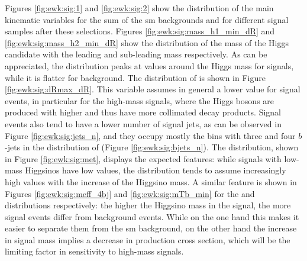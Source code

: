 Figures \ref{fig:ewk:sig:1} and \ref{fig:ewk:sig:2}  show the distribution of the main kinematic variables for 
the sum of the \gls{sm} backgrounds and for different signal samples after these selections.
Figures \ref{fig:ewk:sig:mass_h1_min_dR} and \ref{fig:ewk:sig:mass_h2_min_dR} show the distribution of the mass of the Higgs 
candidate with the leading and sub-leading mass respectively. As can be appreciated, the distribution peaks at values around the Higgs mass for 
signals, while it is flatter for background. 
The distribution of \dRmax is shown in Figure \ref{fig:ewk:sig:dRmax_dR}. This variable assumes in general a lower value for 
signal events, in particular for the high-mass signals, where the Higgs bosons are produced with higher \pt and thus have 
more collimated decay products. Signal events also tend to have a lower number of signal jets, as can be observed in Figure 
\ref{fig:ewk:sig:jets_n}, and they occupy mostly the bins with three and four $b$-jets in the 
distribution of \nbjet (Figure \ref{fig:ewk:sig:bjets_n}). 
The \met distribution, shown in Figure \ref{fig:ewk:sig:met}, displays the expected features: while signals with low-mass Higgsinos 
have low \met values, the distribution tends to assume increasingly high values with the increase of the Higgsino mass. 
A similar feature is shown in Figures \ref{fig:ewk:sig:meff_4bj} and \ref{fig:ewk:sig:mTb_min} for the \meffb and \mtb distributions respectively: 
the higher the Higgsino mass in the signal, the more signal events differ from background events. 
While on the one hand this makes it easier to separate them from the \gls{sm} background, on the other hand the increase in signal mass 
implies a decrease in production cross section, which will be the limiting factor in sensitivity to high-mass signals. 

